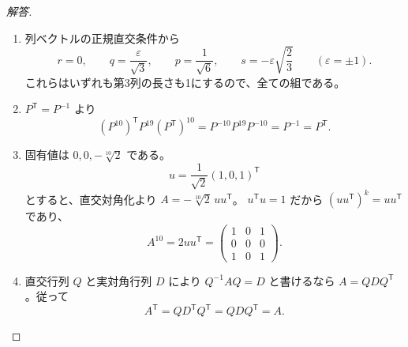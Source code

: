 \begin{proof}[解答]
\begin{enumerate}
  \item[(1)] 列ベクトルの正規直交条件から
  \[
  r=0,\qquad q=\frac{\varepsilon}{\sqrt3},\qquad
  p=\frac1{\sqrt6},\qquad
  s=-\varepsilon\sqrt{\frac23}
  \qquad(\varepsilon=\pm1).
  \]
  これらはいずれも第3列の長さも1にするので、全ての組である。

  \item[(2)] $P^{\mathsf T}=P^{-1}$ より
  \[
  (P^{10})^{\mathsf T}P^{19}(P^{\mathsf T})^{10}
  =P^{-10}P^{19}P^{-10}=P^{-1}=P^{\mathsf T}.
  \]

  \item[(3)] 固有値は $0,0,-\sqrt[10]{2}$ である。
  \[
  u=\frac1{\sqrt2}(1,0,1)^{\mathsf T}
  \]
  とすると、直交対角化より $A=-\sqrt[10]{2}\,uu^{\mathsf T}$。
  $u^{\mathsf T}u=1$ だから $(uu^{\mathsf T})^k=uu^{\mathsf T}$ であり、
  \[
  A^{10}=2uu^{\mathsf T}
  =\begin{pmatrix}1&0&1\\0&0&0\\1&0&1\end{pmatrix}.
  \]

  \item[(4)] 直交行列 $Q$ と実対角行列 $D$ により
  $Q^{-1}AQ=D$ と書けるなら $A=QDQ^{\mathsf T}$。従って
  \[
  A^{\mathsf T}=QD^{\mathsf T}Q^{\mathsf T}=QDQ^{\mathsf T}=A.
  \]
\end{enumerate}
\end{proof}

